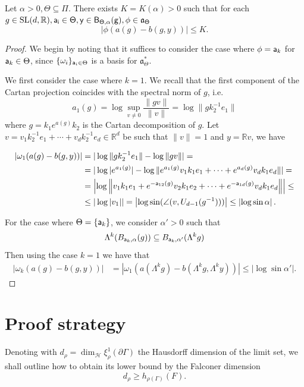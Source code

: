 \documentclass{report}
\begin{document}
\begin{lemma}\label{lem:busemann}
Let $\alpha > 0, \Theta \subseteq \Pi$.
There exists $K = K(\alpha) > 0$ such that for each $g \in \operatorname{{\mathrm{SL}}}(d, \mathbb R), \sf{a_i} \in \Theta, y \in B_{\Theta, \alpha}(g), \phi \in \mathfrak a_\Theta$
\[
    |\phi (a(g) - b(g, y))| \leq K.
\]
\end{lemma}\begin{proof}
We begin by noting that it suffices to consider the case where $\phi = {\sf a}_k$
for ${\sf a}_k \in \Theta$, since $\{ \omega_i \}_{{\sf a}_i \in \Theta} $ 
is a basis for $\mathfrak a_\Theta^*$.

We first consider the case where $k=1$.
We recall that the first component of the Cartan projection coincides with the spectral norm of $g$, i.e.
\[
a_1(g) = \log \sup_{v \neq 0} \frac{\| g v\|}{\|v\|} = \log \|g k_2^{-1} e_1 \|
\] 
where $g = k_1 e^{a(g)} k_2$ is the Cartan decomposition of $g$.
Let $v = v_1 k_2^{-1} e_1 + \cdots + v_d k_2^{-1} e_d \in \mathbb R^d$ be such that $\|v\| = 1$ and $y = \mathbb R v$, we have

\begin{align*}
    |\omega_1(a(g) - b(g, y))| &=
    |\log \|g k_2^{-1} e_1 \| - \log \|g v \| | =\\
    &= |\log |e^{a_1(g)}| - \log \| e^{a_1(g)} v_1 k_1 e_1 + \cdots + e^{a_d(g)} v_d k_1 e_d \| | =\\
    &= \left| \log \left\| v_1 k_1 e_1 + e^{-{\sf a}_{12}(g)} v_2 k_1 e_2 + \cdots
    +  e^{-{\sf a}_{1d}(g)} v_d k_1 e_d \right\| \right| \leq\\
    &\leq |\log |v_1| | = \left| \log \sin( \angle(v, U_{d-1}(g^{-1}))) \right| \leq \left| \log \sin \alpha \right|.
\end{align*}

For the case where $\Theta = \{ {\sf a}_k \}$, we consider $\alpha' > 0$ such that
\[
\Lambda^k (B_{{\sf a}_k, \alpha}(g)) \subseteq B_{{\sf a}_k, \alpha'}(\Lambda^k g)
\]
Then using the case $k=1$ we have that
\begin{align*}
    |\omega_k(a(g) - b(g, y))| &=
    |\omega_1(a(\Lambda^k g) - b(\Lambda^k g, \Lambda^k y))| \leq \left| \log \sin \alpha' \right| .
\end{align*}
\end{proof}

\section{Proof strategy}\label{sec:ProofStrategy}
Denoting with $d_\rho = \dim_{\mathcal H} \xi_\rho^1(\partial \Gamma)$ the Hausdorff  dimension of the limit set, we shall outline how to obtain its lower bound by the Falconer dimension
\[
    d_\rho \geq h_{\rho(\Gamma)}(F).
\]
\end{document}
